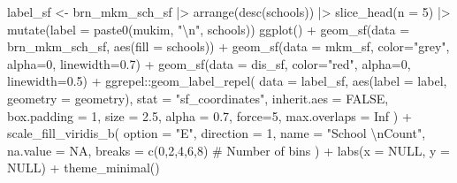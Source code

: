 \documentclass[
  12pt,
]{article}
\newenvironment{Shaded}{\begin{snugshade}}{\end{snugshade}}
\newcommand{\AttributeTok}[1]{\textcolor[rgb]{0.40,0.45,0.13}{#1}}
\newcommand{\CommentTok}[1]{\textcolor[rgb]{0.37,0.37,0.37}{#1}}
\newcommand{\ConstantTok}[1]{\textcolor[rgb]{0.56,0.35,0.01}{#1}}
\newcommand{\DecValTok}[1]{\textcolor[rgb]{0.68,0.00,0.00}{#1}}
\newcommand{\FloatTok}[1]{\textcolor[rgb]{0.68,0.00,0.00}{#1}}
\newcommand{\FunctionTok}[1]{\textcolor[rgb]{0.28,0.35,0.67}{#1}}
\newcommand{\NormalTok}[1]{\textcolor[rgb]{0.00,0.23,0.31}{#1}}
\newcommand{\OtherTok}[1]{\textcolor[rgb]{0.00,0.23,0.31}{#1}}
\newcommand{\SpecialCharTok}[1]{\textcolor[rgb]{0.37,0.37,0.37}{#1}}
\newcommand{\StringTok}[1]{\textcolor[rgb]{0.13,0.47,0.30}{#1}}
\begin{document}
\begin{Shaded}
\begin{Highlighting}[]
\NormalTok{label\_sf }\OtherTok{\textless{}{-}}\NormalTok{ brn\_mkm\_sch\_sf }\SpecialCharTok{|\textgreater{}} 
  \FunctionTok{arrange}\NormalTok{(}\FunctionTok{desc}\NormalTok{(schools)) }\SpecialCharTok{|\textgreater{}} 
  \FunctionTok{slice\_head}\NormalTok{(}\AttributeTok{n =} \DecValTok{5}\NormalTok{) }\SpecialCharTok{|\textgreater{}} 
  \FunctionTok{mutate}\NormalTok{(}\AttributeTok{label =} \FunctionTok{paste0}\NormalTok{(mukim, }\StringTok{"}\SpecialCharTok{\textbackslash{}n}\StringTok{"}\NormalTok{, schools))}
\FunctionTok{ggplot}\NormalTok{() }\SpecialCharTok{+}
  \FunctionTok{geom\_sf}\NormalTok{(}\AttributeTok{data =}\NormalTok{ brn\_mkm\_sch\_sf, }\FunctionTok{aes}\NormalTok{(}\AttributeTok{fill =}\NormalTok{ schools)) }\SpecialCharTok{+}
  \FunctionTok{geom\_sf}\NormalTok{(}\AttributeTok{data =}\NormalTok{ mkm\_sf, }\AttributeTok{color=}\StringTok{"grey"}\NormalTok{, }\AttributeTok{alpha=}\DecValTok{0}\NormalTok{, }\AttributeTok{linewidth=}\FloatTok{0.7}\NormalTok{) }\SpecialCharTok{+}
  \FunctionTok{geom\_sf}\NormalTok{(}\AttributeTok{data =}\NormalTok{ dis\_sf, }\AttributeTok{color=}\StringTok{"red"}\NormalTok{, }\AttributeTok{alpha=}\DecValTok{0}\NormalTok{, }\AttributeTok{linewidth=}\FloatTok{0.5}\NormalTok{) }\SpecialCharTok{+}
\NormalTok{  ggrepel}\SpecialCharTok{::}\FunctionTok{geom\_label\_repel}\NormalTok{(}
    \AttributeTok{data =}\NormalTok{ label\_sf,}
    \FunctionTok{aes}\NormalTok{(}\AttributeTok{label =}\NormalTok{ label, }\AttributeTok{geometry =}\NormalTok{ geometry),}
    \AttributeTok{stat =} \StringTok{"sf\_coordinates"}\NormalTok{,}
    \AttributeTok{inherit.aes =} \ConstantTok{FALSE}\NormalTok{,}
    \AttributeTok{box.padding =} \DecValTok{1}\NormalTok{,}
    \AttributeTok{size =} \FloatTok{2.5}\NormalTok{,}
    \AttributeTok{alpha =} \FloatTok{0.7}\NormalTok{,}
    \AttributeTok{force=}\DecValTok{5}\NormalTok{,}
    \AttributeTok{max.overlaps =} \ConstantTok{Inf}
\NormalTok{  ) }\SpecialCharTok{+}
  \FunctionTok{scale\_fill\_viridis\_b}\NormalTok{(}
    \AttributeTok{option =} \StringTok{"E"}\NormalTok{,}
    \AttributeTok{direction =} \DecValTok{1}\NormalTok{,}
    \AttributeTok{name =} \StringTok{"School }\SpecialCharTok{\textbackslash{}n}\StringTok{Count"}\NormalTok{,}
    \AttributeTok{na.value =} \ConstantTok{NA}\NormalTok{,}
    \AttributeTok{breaks =} \FunctionTok{c}\NormalTok{(}\DecValTok{0}\NormalTok{,}\DecValTok{2}\NormalTok{,}\DecValTok{4}\NormalTok{,}\DecValTok{6}\NormalTok{,}\DecValTok{8}\NormalTok{)    }\CommentTok{\# Number of bins}
\NormalTok{  ) }\SpecialCharTok{+}
  \FunctionTok{labs}\NormalTok{(}\AttributeTok{x =} \ConstantTok{NULL}\NormalTok{, }\AttributeTok{y =} \ConstantTok{NULL}\NormalTok{) }\SpecialCharTok{+}
  \FunctionTok{theme\_minimal}\NormalTok{()}
\end{Highlighting}
\end{Shaded}
\end{document}
